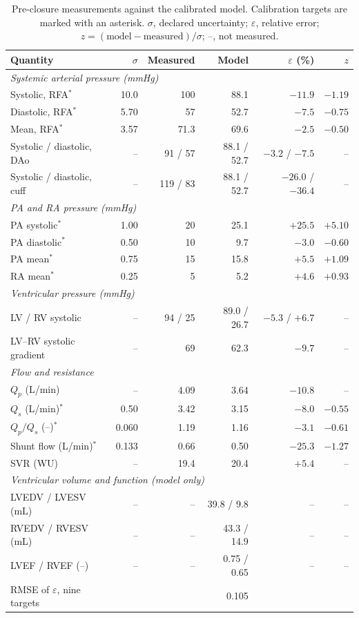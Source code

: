 \begin{table}[!htbp]
\centering\small
\setlength{\tabcolsep}{4pt}
\caption{Pre-closure measurements against the calibrated model. Calibration targets are marked with an asterisk. $\sigma$, declared uncertainty; $\varepsilon$, relative error; $z = (\text{model}-\text{measured})/\sigma$; --, not measured.}
\label{tab:pre_targets}
\begin{tabular}{lrrrrr}
\toprule
\textbf{Quantity} & $\sigma$ & \textbf{Measured} & \textbf{Model} & $\varepsilon$ (\%) & $z$ \\
\midrule
\multicolumn{6}{l}{\emph{Systemic arterial pressure (mmHg)}} \\
Systolic, RFA$^{*}$ & 10.0 & 100 & 88.1 & $-11.9$ & $-1.19$ \\
Diastolic, RFA$^{*}$ & 5.70 & 57 & 52.7 & $-7.5$ & $-0.75$ \\
Mean, RFA$^{*}$ & 3.57 & 71.3 & 69.6 & $-2.5$ & $-0.50$ \\
Systolic / diastolic, DAo & -- & 91 / 57 & 88.1 / 52.7 & $-3.2$ / $-7.5$ & -- \\
Systolic / diastolic, cuff & -- & 119 / 83 & 88.1 / 52.7 & $-26.0$ / $-36.4$ & -- \\
\multicolumn{6}{l}{\emph{PA and RA pressure (mmHg)}} \\
PA systolic$^{*}$ & 1.00 & 20 & 25.1 & $+25.5$ & $+5.10$ \\
PA diastolic$^{*}$ & 0.50 & 10 & 9.7 & $-3.0$ & $-0.60$ \\
PA mean$^{*}$ & 0.75 & 15 & 15.8 & $+5.5$ & $+1.09$ \\
RA mean$^{*}$ & 0.25 & 5 & 5.2 & $+4.6$ & $+0.93$ \\
\multicolumn{6}{l}{\emph{Ventricular pressure (mmHg)}} \\
LV / RV systolic & -- & 94 / 25 & 89.0 / 26.7 & $-5.3$ / $+6.7$ & -- \\
LV--RV systolic gradient & -- & 69 & 62.3 & $-9.7$ & -- \\
\multicolumn{6}{l}{\emph{Flow and resistance}} \\
$Q_p$ (L/min) & -- & 4.09 & 3.64 & $-10.8$ & -- \\
$Q_s$ (L/min)$^{*}$ & 0.50 & 3.42 & 3.15 & $-8.0$ & $-0.55$ \\
$Q_p/Q_s$ (--)$^{*}$ & 0.060 & 1.19 & 1.16 & $-3.1$ & $-0.61$ \\
Shunt flow (L/min)$^{*}$ & 0.133 & 0.66 & 0.50 & $-25.3$ & $-1.27$ \\
SVR (WU) & -- & 19.4 & 20.4 & $+5.4$ & -- \\
\multicolumn{6}{l}{\emph{Ventricular volume and function (model only)}} \\
LVEDV / LVESV (mL) & -- & -- & 39.8 / 9.8 & -- & -- \\
RVEDV / RVESV (mL) & -- & -- & 43.3 / 14.9 & -- & -- \\
LVEF / RVEF (--) & -- & -- & 0.75 / 0.65 & -- & -- \\
\midrule
RMSE of $\varepsilon$, nine targets & & & 0.105 & & \\
\bottomrule
\end{tabular}
\end{table}

